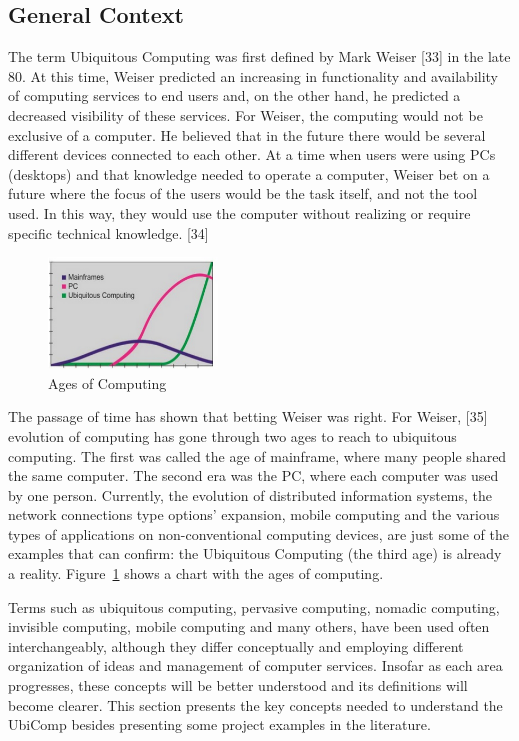 \documentclass{acm_proc_article-sp}
\begin{document}
\subsection{General Context}
The term Ubiquitous Computing was first defined by Mark Weiser [33] in the late 80. At this time, Weiser predicted an increasing in functionality and availability of computing services to end users and, on the other hand, he predicted a decreased visibility of these services. For Weiser, the computing would not be exclusive of a computer. He believed that in the future there would be several different devices connected to each other. At a time when users were using PCs (desktops) and that knowledge needed to operate a computer,  Weiser bet on a future where the focus of the users would be the task itself, and not the tool used. In this way, they would use the computer without realizing or require specific technical knowledge. [34]
\begin{figure}[h]
    \includegraphics[width=0.4\textwidth,natwidth=610,natheight=642]{pictures/era.png}
    \caption{Ages of Computing}
    \label{fig:era}
\end{figure}
\newline
\newline
The passage of time has shown that betting Weiser was right. For Weiser, [35] evolution of computing has gone through two ages to reach to ubiquitous computing. The first was called the age of mainframe, where many people shared the same computer. The second era was the PC, where each computer was used by one person. Currently, the evolution of distributed information systems, the network connections type options'  expansion, mobile computing and the various types of applications on non-conventional computing devices, are just some of the examples that can confirm: the Ubiquitous Computing (the third age) is already a reality. Figure~\ref{fig:era} shows a chart with the ages of computing.
\newline
\newline


Terms such as ubiquitous computing, pervasive computing, nomadic computing, invisible computing, mobile computing and many others, have been used often interchangeably, although they differ conceptually and employing different organization of ideas and management of computer services. Insofar as each area progresses, these concepts will be better understood and its definitions will become clearer. This section presents the key concepts needed to understand the UbiComp besides presenting some project examples in the literature.
\end{document}
